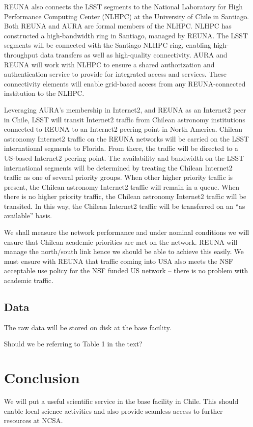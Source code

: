 REUNA also connects the LSST segments to the National Laboratory for High Performance Computing Center (NLHPC) at the University of Chile in Santiago.
Both REUNA and AURA are formal members of the NLHPC.
NLHPC has constructed a high-bandwidth ring in Santiago, managed by REUNA.
The LSST segments will be connected with the Santiago NLHPC ring, enabling high-throughput data transfers as well as high-quality connectivity.
AURA and REUNA will work with NLHPC to ensure a shared authorization and authentication service to provide for integrated access and services.
These connectivity elements will enable grid-based access from any REUNA-connected institution to the NLHPC.

Leveraging AURA’s membership in Internet2, and REUNA as an Internet2 peer in Chile, LSST will transit Internet2 traffic from Chilean astronomy institutions connected to REUNA to an Internet2 peering point in North America.
Chilean astronomy Internet2 traffic on the REUNA networks will be carried on the LSST international segments to Florida.
From there, the traffic will be directed to a US-based Internet2 peering point.
The availability and bandwidth on the LSST international segments will be determined by treating the Chilean Internet2 traffic as one of several priority groups.
When other higher priority traffic is present, the Chilean astronomy Internet2 traffic will remain in a queue.
When there is no higher priority traffic, the Chilean astronomy Internet2 traffic will be transited.
In this way, the Chilean Internet2 traffic will be transferred on an ``as available'' basis.

We shall measure the network performance and under nominal conditions we will ensure that Chilean academic priorities are met on the network.
REUNA will manage the north/south link hence we should be able to achieve this easily.
We must ensure with REUNA that traffic coming into USA also meets the NSF acceptable use policy for the NSF funded US network -- there is no problem with academic traffic.


\subsection{Data}
\label{sec:data}

The raw data will be stored on disk at the base facility.

\begin{draftnote}
  Should we be referring to Table 1 in the text?
\end{draftnote}



\section{Conclusion}

We will put a useful scientific service in the base facility in Chile.
This should enable local science activities and also provide seamless access to further resources at NCSA.
